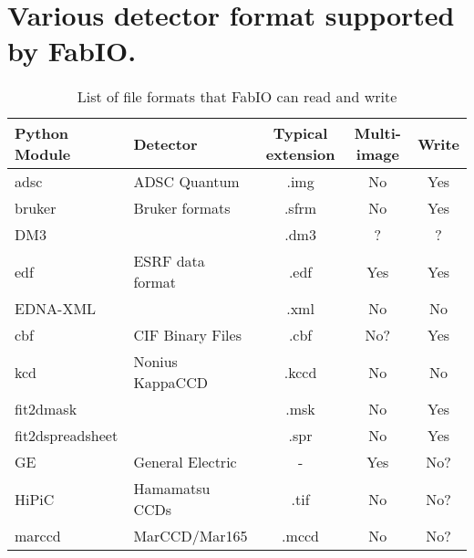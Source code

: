 \documentclass{iucr}
\begin{document}




\appendix
\section{Various detector format supported by FabIO.}
\onecolumn
\begin{table}[h]

\caption{\label{format}List of file formats that FabIO can read and write}
\vspace{1mm}
\begin{center}
\begin{tabular}{llccc}
Python Module   & Detector		& Typical extension & Multi-image	& Write\\%
\hline %
adsc	   &   ADSC Quantum		&	.img	&	No	&	Yes		\\%
bruker		&   Bruker formats		&	.sfrm	&	No	&	Yes		\\%
DM3			&						&	.dm3	&	?	&	?		\\%
edf		    &   ESRF data format	&	.edf	&	Yes	&	Yes		\\%
EDNA-XML \cite{edna}	& &	.xml	&	No		&	No	 \\%
cbf		    &   CIF Binary Files	&	.cbf	&	No?	& 	Yes		\\%
kcd	    	&   Nonius 	KappaCCD	&	.kccd	&	No 	&	No		\\%
fit2dmask \cite{fit2d} 	&			&   .msk    &   No  &   Yes  \\
fit2dspreadsheet \cite{fit2d}	&  	&  .spr    &   No  &   Yes    \\
GE		    &   General Electric	&	-		&	Yes	&	No?		\\%
HiPiC       & Hamamatsu CCDs 		&	.tif	&	No	&	No?	 	\\%
marccd		&   MarCCD/Mar165		&	.mccd	&	No	&	No?		\\%

\end{tabular}
\end{center}
\end{table}
\end{document}
